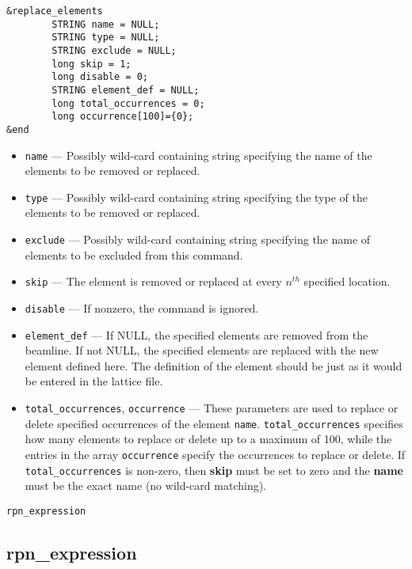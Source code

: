 \documentclass[11pt]{article}
\begin{document}
\begin{verbatim}
&replace_elements
        STRING name = NULL;
        STRING type = NULL;
        STRING exclude = NULL;
        long skip = 1;
        long disable = 0;
        STRING element_def = NULL;
        long total_occurrences = 0;
        long occurrence[100]={0};
&end
\end{verbatim}

\begin{itemize}
\item \verb|name| --- Possibly wild-card containing string specifying the
	name of the elements to be removed or replaced.
\item \verb|type| --- Possibly wild-card containing string specifying the
   type of the elements to be removed or replaced.
\item \verb|exclude| --- Possibly wild-card containing string specifying 
	the name of elements to be excluded from this command.
\item \verb|skip| --- The element is removed or replaced at every $n^{th}$ 
   specified location.
\item \verb|disable| --- If nonzero, the command is ignored.
\item \verb|element_def| --- If NULL, the specified elements are removed from
   the beamline. If not NULL, the specified elements are replaced with the new element
   defined here. The definition of the element should be just as it would be entered in 
   the lattice file.
\item \verb|total_occurrences|, \verb|occurrence| --- 
These parameters are used to replace or delete specified occurrences of 
the element \verb|name|.  \verb|total_occurrences| specifies how many elements to replace
or delete up to a maximum of 100, while the entries in the array \verb|occurrence| specify the occurrences
to replace or delete. If \verb|total_occurrences| is non-zero, then {\bf skip} must
be set to zero  and the {\bf name} must be the exact name (no wild-card matching). 
\end{itemize}

\begin{latexonly}
\newpage
\begin{center}{\Large\verb|rpn_expression|}\end{center}
\end{latexonly}
\subsection{rpn\_expression \label{subsec:rpnexpression}}
\end{document}
